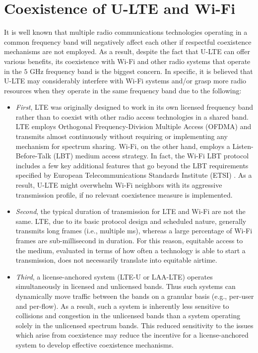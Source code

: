 \section{Coexistence of U-LTE and Wi-Fi}
\label{coexist}
It is well known that multiple radio communications technologies operating in a common frequency band will negatively affect each other if respectful coexistence mechanisms are not employed. As a result, despite the fact that U-LTE can offer various benefits, its coexistence with Wi-Fi and other radio systems that operate in the $5$ GHz frequency band is the biggest concern. In specific, it is believed that U-LTE may considerably interfere with Wi-Fi systems and/or grasp more radio resources when they operate in the same frequency band due to the following:
\begin{itemize}
\item \textit{First}, LTE was originally designed to work in its own licensed frequency band rather than to coexist with other radio access technologies in a shared band. LTE employs Orthogonal Frequency-Division Multiple Access (OFDMA) and transmits almost continuously without requiring or implementing any mechanism for spectrum sharing. Wi-Fi, on the other hand, employs a Listen-Before-Talk (LBT) medium access strategy.  In fact, the Wi-Fi LBT protocol includes a few key additional features that go beyond the LBT requirements specified by European Telecommunications Standards Institute (ETSI) \cite{LBT-ETSI-2014}. As a result, U-LTE might overwhelm Wi-Fi neighbors with its aggressive transmission profile, if no relevant coexistence measure is implemented.

\item \textit{Second}, the typical duration of transmission for LTE and Wi-Fi are not the same. LTE, due to its basic protocol design and scheduled nature, generally transmits long frames (i.e., multiple ms), whereas a large percentage of Wi-Fi frames are sub-millisecond in duration. For this reason, equitable access to the medium, evaluated in terms of how often a technology is able to start a transmission, does not necessarily translate into equitable airtime.

\item \textit{Third}, a license-anchored system (LTE-U or LAA-LTE) operates simultaneously in licensed and unlicensed bands.  Thus such systems can dynamically move traffic between the bands on a granular basis (e.g., per-user and per-flow). As a result, such a system is inherently less sensitive to collisions and congestion in the unlicensed bands than a system operating solely in the unlicensed spectrum bands.  This reduced sensitivity to the issues which arise from coexistence may reduce the incentive for a license-anchored system to develop effective coexistence mechanisms.
\end{itemize}

